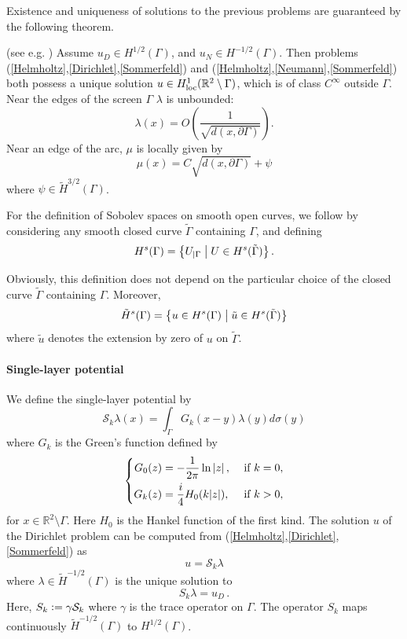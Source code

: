 \documentclass[a4paper]{article}
\begin{document}
Existence and uniqueness of solutions to the previous problems are guaranteed by the following theorem.
\begin{The}
	(see e.g. \cite{stephan1984augmented,wendland1990hypersingular,monch1996numerical}) Assume $u_D \in H^{1/2}(\Gamma)$, and $u_N \in H^{-1/2}(\Gamma)$. Then problems (\ref{Helmholtz},\ref{Dirichlet},\ref{Sommerfeld}) and (\ref{Helmholtz},\ref{Neumann},\ref{Sommerfeld}) both possess a unique solution $u \in H^1_\textup{loc}(\mathbb{R}^2 \setminus \Gamma)$, which is of class $C^{\infty}$ outside $\Gamma$. Near the edges of the screen $\Gamma$ $\lambda$ is unbounded:
	\[\lambda(x) = O\left(\frac{1}{\sqrt{d(x,\partial \Gamma)}}\right).\]
	Near an edge of the arc, $\mu$ is locally given by
	\[\mu(x) = C\sqrt{d(x,\partial \Gamma)} + \psi\]
	where $\psi \in \tilde{H}^{3/2}(\Gamma)$.
\end{The}

For the definition of Sobolev spaces on smooth open curves, we follow
\cite{mclean2000strongly} by considering any smooth closed curve $\tilde{\Gamma}$ containing $\Gamma$, and defining 
\[H^s(\Gamma) = \left\{U_{|\Gamma}\mathrel{}\middle|\mathrel{} U \in H^s(\tilde{\Gamma}) \right\}.\]

Obviously, this definition does not depend on the particular choice of the closed curve $\tilde{\Gamma}$ containing $\Gamma$. Moreover,
\[\tilde{H}^s(\Gamma) = \left\{u \in H^s(\Gamma)\mathrel{}\middle|\mathrel{}\tilde{u} \in H^s(\tilde{\Gamma})\right\}\]
where $\tilde{u}$ denotes the extension by zero of $u$ on $\tilde{\Gamma}$.

\paragraph{Single-layer potential}  
We define the single-layer potential by
\begin{equation}
	\mathcal{S}_k\lambda(x) = \int_{\Gamma}G_k(x-y)\lambda(y)d\sigma(y)
	\label{defSk}
\end{equation}
	where $G_k$ is the Green's function defined by 
\begin{equation}
	\left\{
	\begin{aligned}
		G_0(z) &= -\dfrac{1}{2\pi} \ln \left\lvert z \right\rvert, && \text{ if } k= 0,\\
		G_k(z) &= \frac{i}{4}H_0(k|z|), && \text{ if } k > 0,
	\end{aligned} 
	\right.
\end{equation} 
for $x\in \mathbb{R}^2\setminus \Gamma$. Here $H_0$ is the Hankel function of the first kind. 
The solution $u$ of the Dirichlet problem can be computed from (\ref{Helmholtz},\ref{Dirichlet},\ref{Sommerfeld}) as
\begin{equation}
	u = \mathcal{S}_k \lambda
\end{equation}
where $\lambda \in \tilde{H}^{-1/2}(\Gamma)$ is the unique solution to 
\begin{equation}
	S_k \lambda = u_D\,.
	\label{Sklambda}
\end{equation}
Here, $S_k \mathrel{\mathop:}= \gamma \mathcal{S}_k$ where $\gamma$ is the trace operator on $\Gamma$. The operator $S_k$ maps continuously $\tilde{H}^{-1/2}(\Gamma)$ to $H^{1/2}(\Gamma)$.
\end{document}
